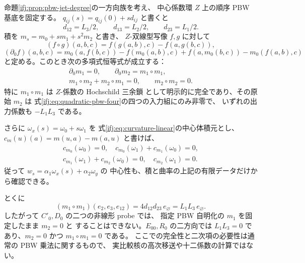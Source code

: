 \begin{proposition}
\label{ifj:prop:pbw-curved-mc}
命題\ref{ifj:prop:pbw-jet-degree}の一方向族を考え、
中心係数環 $Z$ 上の順序 PBW 基底を固定する。
$q_{ij}(s)=q_{ij}(0)+sd_{ij}$ と書くと
\[
 d_{12}=L_3/2,\qquad d_{13}=L_2/2,\qquad d_{23}=L_1/2.
\]
積を $m_s=m_0+sm_1+s^2m_2$ と書き、
$Z$-双線型写像 $f,g$ に対して
\[
 (f\circ g)(a,b,c)=f(g(a,b),c)-f(a,g(b,c)),
\]
\[
 (\partial_0 f)(a,b,c)
 =m_0(a,f(b,c))-f(m_0(a,b),c)
  +f(a,m_0(b,c))-m_0(f(a,b),c)
\]
と定める。このとき次の多項式恒等式が成立する：
\begin{equation}\label{ifj:eq:pbw-curved-mc}
 \begin{gathered}
 \partial_0m_1=0,\qquad \partial_0m_2=m_1\circ m_1,\\
 m_1\circ m_2+m_2\circ m_1=0,\qquad m_2\circ m_2=0.
 \end{gathered}
\end{equation}
特に $m_1\circ m_1$ は $Z$-係数の Hochschild 三余鎖
として明示的に完全であり、その原始 $m_2$ は
式\eqref{ifj:eq:quadratic-pbw-four}の四つの入力組にのみ非零で、
いずれの出力係数も $-L_1L_3$ である。

さらに $\omega_x(s)=\omega_0+s\omega_1$ を
式\eqref{ifj:eq:curvature-linear}の中心体積元とし、
$c_m(u)(a)=m(u,a)-m(a,u)$ と書けば、
\begin{equation}\label{ifj:eq:pbw-curvature-mc}
 \begin{gathered}
 c_{m_0}(\omega_0)=0,\quad
 c_{m_0}(\omega_1)+c_{m_1}(\omega_0)=0,\\
 c_{m_1}(\omega_1)+c_{m_2}(\omega_0)=0,\quad
 c_{m_2}(\omega_1)=0.
 \end{gathered}
\end{equation}
従って $w_s=\alpha_1\omega_x(s)+\alpha_2\omega_y$ の
中心性も、積と曲率の上記の有限データだけから確認できる。

とくに
\begin{equation}\label{ifj:eq:pbw-mc-obstruction-witness}
 (m_1\circ m_1)(e_2,e_3,e_{12})
 =4d_{12}d_{23}\,e_\varnothing
 =L_1L_3\,e_\varnothing.
\end{equation}
したがって $C'_0,D_0$ の二つの非線形 probe では、
指定 PBW 自明化の $m_1$ を固定したまま $m_2=0$ と
することはできない。$E_{00},R_0$ の二方向では
$L_1L_3=0$ であり、$m_2=0$ かつ $m_1\circ m_1=0$ である。
ここでの完全性と二次項の必要性は通常の PBW 乗法に関するもので、
実比較核の高次移送や十二係数の計算ではない。
\end{proposition}

